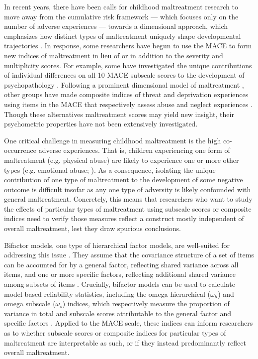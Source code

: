\documentclass[letterpaper,man,natbib,floatsintext,longtable]{apa6}
\begin{document}
In recent years, there have been calls for childhood maltreatment research to move away from the cumulative risk framework \citep{evans2013cumulative} --- which focuses only on the number of adverse experiences --- towards a dimensional approach, which emphasizes how distinct types of maltreatment uniquely shape developmental trajectories \citep{mclaughlin2016beyond, belsky2012beyond}. In response, some researchers have begun to use the MACE to form new indices of maltreatment in lieu of or in addition to the severity and multiplicity scores. For example, some have investigated the unique contributions of individual differences on all 10 MACE subscale scores to the development of psychopathology \citep{schalinski2015type, gerke2018childhood, schalinski2019early}. Following a prominent dimensional model of maltreatment \citep{mclaughlin2014childhood}, other groups have made composite indices of threat and deprivation experiences using items in the MACE that respectively assess abuse and neglect experiences \citep{schalinski2018defining, schalinski2019environmental, teicher2018differential}. Though these alternatives maltreatment scores may yield new insight, their psychometric properties have not been extensively investigated.   

One critical challenge in measuring childhood maltreatment is the high co-occurrence adverse experiences. That is, children experiencing one form of maltreatment (e.g. physical abuse) are likely to experience one or more other types (e.g. emotional abuse; \citealt{green2010childhood, mclaughlin2012childhood, marques2021risk, mersky2017rethinking}). As a consequence, isolating the unique contribution of one type of maltreatment to the development of some negative outcome is difficult insofar as any one type of adversity is likely confounded with general maltreatment. Concretely, this means that researchers who want to study the effects of particular types of maltreatment using subscale scores or composite indices need to verify those measures reflect a construct mostly independent of overall maltreatment, lest they draw spurious conclusions.

Bifactor models, one type of hierarchical factor models, are well-suited for addressing this issue \citep{bornovalova2020appropriate}. They assume that the covariance structure of a set of items can be accounted for by a general factor, reflecting shared variance across all items, and one or more specific factors, reflecting additional shared variance among subsets of items \citep{Reise2012-ql}. Crucially, bifactor models can be used to calculate model-based reliability statistics, including the omega hierarchical ($\omega_h$) and omega subscale ($\omega_s$) indices, which respectively measure the proportion of variance in total and subscale scores attributable to the general factor and specific factors \citep{reise2013applying, rodriguez2016evaluating}. Applied to the MACE scale, these indices can inform researchers as to whether subscale scores or composite indices for particular types of maltreatment are interpretable as such, or if they instead predominantly reflect overall maltreatment. 
\end{document}
